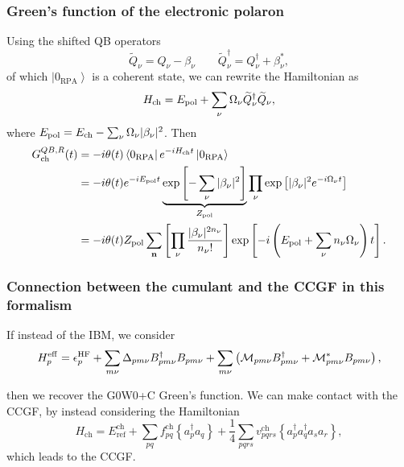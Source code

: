 \begin{frame}
    \frametitle{Green's function of the electronic polaron}
Using the shifted QB operators
\begin{equation}
\widetilde Q_\nu
=
Q_\nu
- \beta_\nu
\qquad
\widetilde Q_\nu^\dagger
=
Q_\nu^\dagger
+
\beta_\nu^*,
\end{equation}
of which $\left|0_{\mathrm{RPA}}\right\rangle$ is a coherent state,
\pause we can rewrite the Hamiltonian as
\begin{equation}
H_{\rm ch}
=
E_{\rm pol}
+
\sum_\nu
\Omega_\nu
\widetilde Q_\nu^\dagger \widetilde Q_\nu ,
\end{equation}
where $E_{\rm pol}=E_{\rm ch}-\sum_\nu \Omega_\nu |\beta_\nu|^2$. \pause Then
\begin{align}
G^{QB,R}_{\rm ch}(t)
&=
-i \theta(t)
\left\langle 0_{\rm RPA} \right|
e^{-i H_{\rm ch} t}
\left|0_{\rm RPA}\right\rangle
\\
&=
-i \theta(t)
e^{-i E_{\rm pol} t}
\underbrace{
\exp
\left[
-\sum_{\nu} |\beta_{\nu}|^2
\right]
}_{Z_{\rm pol}}
\prod_{\nu}
\exp
\left[
|\beta_{\nu}|^2 e^{-i\Omega_{\nu} t}
\right]
\\
&=
-i \theta(t)
Z_{\rm pol}
\sum_{\mathbf n}
\left[
\prod_{\nu}
\frac{
|\beta_{\nu}|^{2n_{\nu}}
}{
n_{\nu}!
}
\right]
\exp
\left[
-i
\left(
E_{\rm pol}
+
\sum_{\nu} n_{\nu}\Omega_{\nu}
\right)t
\right].
\end{align}
\end{frame}
\begin{frame}
    \frametitle{Connection between the cumulant and the CCGF in this formalism}
If instead of the IBM, we consider
\begin{equation}
H_p^{\rm eff}
=
\epsilon_p^{\rm HF}
+
\sum_{m\nu}
\Delta_{pm\nu}
B_{pm\nu}^{\dagger}
B_{pm\nu}
+
\sum_{m\nu}
\left(
\mathcal{M}_{pm\nu}
B_{pm\nu}^{\dagger}
+
\mathcal{M}_{pm\nu}^{*}
B_{pm\nu}
\right),
\end{equation}

then we recover the G0W0+C Green's function. \pause We can make contact with the CCGF, by instead considering the Hamiltonian
\begin{equation}
H_{\mathrm{ch}}=E_{\mathrm{ref}}^{\mathrm{ch}}+\sum_{p q} f_{p q}^{\mathrm{ch}}\left\{a_p^{\dagger} a_q\right\}+\frac{1}{4} \sum_{p q r s} v_{p q r s}^{\mathrm{ch}}\left\{a_p^{\dagger} a_q^{\dagger} a_s a_r\right\},
\end{equation}
which leads to the CCGF.
\end{frame}
